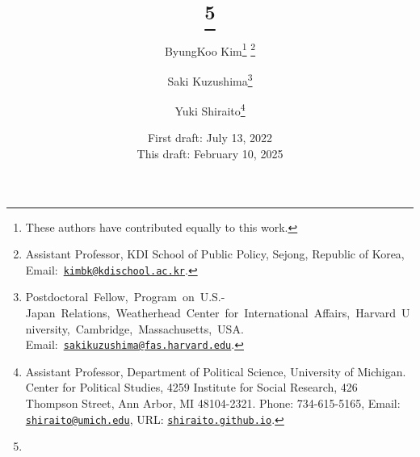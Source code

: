 \blind

{
\title{
  \tit\thanks{
  \protect
  }
}


\author{
ByungKoo Kim\thanks{These authors have contributed equally to this work.} \thanks{
    Assistant Professor, KDI School of Public Policy, Sejong, Republic of Korea, Email:~\href{mailto:kimbk@kdischool.ac.kr}{\tt kimbk@kdischool.ac.kr}.
    }
\and
Saki Kuzushima\footnotemark[2] \thanks{
    Postdoctoral~Fellow,~Program~on~U.S.-Japan~Relations,~Weatherhead~Center~for~International~Affairs,~Harvard~University,~Cambridge,~Massachusetts,~USA. Email:~\href{mailto:sakikuzushima@fas.harvard.edu}{\tt sakikuzushima@fas.harvard.edu}.
    }
\and
Yuki Shiraito\thanks{
    Assistant Professor, Department of Political Science, University of Michigan. Center for Political Studies, 4259 Institute for Social Research, 426 Thompson Street, Ann Arbor, MI 48104-2321.  Phone: 734-615-5165, Email: \href{mailto:shiraito@umich.edu}{\tt shiraito@umich.edu}, URL: \href{https://shiraito.github.io}{\tt shiraito.github.io}.
    }
 }


\date{
First draft: July 13, 2022 \\ %
This draft: February 10, 2025
}

}\fi

\blind
{
 \title{\tit}
 \date{}

}\fi
